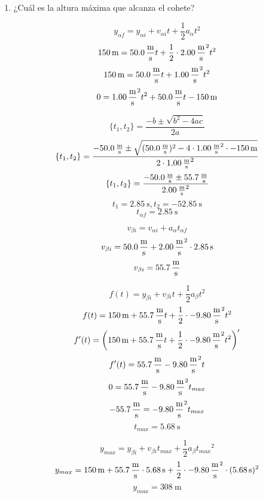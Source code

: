 \documentclass[Análisis.root.tex]{subfiles}
\begin{document}
\begin{enumerate}
        \begin{enumerate}
          \item ¿Cuál es la altura máxima que alcanza el cohete?

                \begin{multicols}{2}
                  \[y_{\alpha f}=y_{\alpha i}+v_{\alpha i}t+\frac{1}{2}a_\alpha t^2\]
                  \[\SI{150}{\meter}=\SI{50,0}{\meter\over\second}t+\frac{1}{2}\cdot\SI{2,00}{\meter\over\second\squared}t^2\]
                  \[\SI{150}{\meter}=\SI{50,0}{\meter\over\second}t+\SI{1,00}{\meter\over\second\squared}t^2\]
                  \[0=\SI{1,00}{\meter\over\second\squared}t^2+\SI{50,0}{\meter\over\second}t-\SI{150}{\meter}\]

                  \[\{t_1,t_2\}=\frac{-b\pm\sqrt{b^2-4ac}}{2a}\]
                  \[\{t_1,t_2\}=\frac{\SI{-50,0}{\meter\over\second}\pm\sqrt{(\SI{50,0}{\meter\over\second})^2-4\cdot\SI{1,00}{\meter\over\second\squared}\cdot-\SI{150}{\meter}}}{2\cdot\SI{1,00}{\meter\over\second\squared}}\]
                  \[\{t_1,t_2\}=\frac{\SI{-50,0}{\meter\over\second}\pm\SI{55,7}{\meter\over\second}}{\SI{2,00}{\meter\over\second\squared}}\]
                  \[t_1=\SI{2.85}{\second}, t_2=\SI{-52,85}{\second}\]
                  \[t_{\alpha f}=\SI{2.85}{\second}\]

                  \[v_{\beta i}=v_{\alpha i}+a_\alpha t_{\alpha f}\]
                  \[v_{\beta i}=\SI{50,0}{\meter\over\second}+\SI{2,00}{\meter\over\second\squared}\cdot\SI{2.85}{\second}\]
                  \[v_{\beta i}=\SI{55,7}{\meter\over\second}\]

                  \[f(t)=y_{\beta i}+v_{\beta i}t+\frac{1}{2}a_\beta t^2\]
                  \[f(t)=\SI{150}{\meter}+\SI{55,7}{\meter\over\second}t+\frac{1}{2}\cdot\SI{-9,80}{\meter\over\second\squared}t^2\]
                  \[f'(t)=\left(\SI{150}{\meter}+\SI{55,7}{\meter\over\second}t+\frac{1}{2}\cdot\SI{-9,80}{\meter\over\second\squared}t^2\right)'\]
                  \[f'(t)=\SI{55,7}{\meter\over\second}-\SI{9,80}{\meter\over\second\squared}t\]
                  \[0=\SI{55,7}{\meter\over\second}-\SI{9,80}{\meter\over\second\squared}t_{max}\]
                  \[\SI{-55,7}{\meter\over\second}=\SI{-9,80}{\meter\over\second\squared}t_{max}\]
                  \[t_{max}=\SI{5,68}{\second}\]

                  \[y_{max}=y_{\beta i}+v_{\beta i}t_{max}+\frac{1}{2}a_\beta{t_{max}}^2\]
                  \[y_{max}=\SI{150}{\meter}+\SI{55,7}{\meter\over\second}\cdot\SI{5,68}{\second}+\frac{1}{2}\cdot\SI{-9,80}{\meter\over\second\squared}\cdot(\SI{5,68}{\second})^2\]
                  \[y_{max}=\boxed{\SI{308}{\meter}}\]
                \end{multicols}


\end{enumerate}
\end{enumerate}
\end{document}
